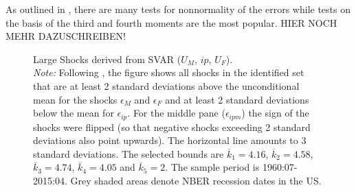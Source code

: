 \documentclass[a4paper,11pt,listof=nochaptergap,oneside,pointednumbers,bibtotoc,bigheadings,liststotoc,hidelinks]{scrbook}
\theoremstyle{mysatz}
\theoremstyle{mydefinition}
\theoremstyle{mytheorem}
\theoremstyle{mybemerkung}
\begin{document}
As outlined in \citet{lutkepohlkilian:17}, there are many tests for nonnormality of the errors while tests on the basis of the third and fourth moments are the most popular. HIER NOCH MEHR DAZUSCHREIBEN!


\begin{figure}[!h]
   \centering
   \setlength\fboxsep{0pt}
   \setlength\fboxrule{0pt}
      \caption[Large Shocks derived from SVAR ($U_{M}$, $ip$, $U_{F}$).]{Large Shocks derived from SVAR ($U_{M}$, $ip$, $U_{F}$).\\
      \textit{Note:} Following \citet{ludvigsonetal:18}, the figure shows all shocks in the identified set that are at least 2 standard deviations above the unconditional mean for the shocks $\epsilon_{M}$ and $\epsilon_{F}$ and at least 2 standard deviations below the mean for $\epsilon_{ip}$. For the middle pane ($\epsilon_{ipm}$) the sign of the shocks were flipped (so that negative shocks exceeding 2 standard deviations also point upwards). The horizontal line amounts to 3 standard deviations. The selected bounds are $\overline{k}_1 = 4.16$, $\overline{k}_2 = 4.58$, $\overline{k}_3 = 4.74$, $\overline{k}_4 = 4.05$ and $\overline{k}_5 = 2$. The sample period is 1960:07-2015:04. Grey shaded areas denote NBER recession dates in the US.}   \label{fig:ludvigsonetal_timeseries_e_largeshocks}
\end{figure}
\end{document}

